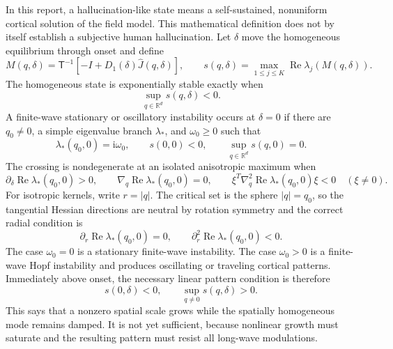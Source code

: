\documentclass[11pt]{article}
\newcommand{\ii}{\mathrm{i}}
\newcommand{\RePart}{\operatorname{Re}}
\newcommand{\T}{\mathsf T}
\begin{document}
In this report, a hallucination-like state means a self-sustained,
nonuniform cortical solution of the field model.  This mathematical
definition does not by itself establish a subjective human hallucination.
Let $\delta$ move the homogeneous equilibrium through onset and define
\begin{equation}
 M(q,\delta)=\T^{-1}\left[-I+D_1(\delta)\widehat J(q,\delta)\right],
 \qquad
 s(q,\delta)=\max_{1\le j\le K}
 \RePart\lambda_j(M(q,\delta)).
 \label{eq:pattern-spectral-abscissa}
\end{equation}
The homogeneous state is exponentially stable exactly when
\begin{equation}
 \sup_{q\in\mathbb R^d}s(q,\delta)<0.
 \label{eq:homogeneous-Rd-gap}
\end{equation}
A finite-wave stationary or oscillatory instability occurs at
$\delta=0$ if there are $q_0\ne0$, a simple eigenvalue branch
$\lambda_*$, and $\omega_0\geq0$ such that
\begin{equation}
 \lambda_*(q_0,0)=\ii\omega_0,
 \qquad
 s(0,0)<0,
 \qquad
 \sup_{q\in\mathbb R^d}s(q,0)=0.
 \label{eq:finite-wave-threshold}
\end{equation}
The crossing is nondegenerate at an isolated anisotropic maximum when
\begin{equation}
 \partial_\delta\RePart\lambda_*(q_0,0)>0,
 \qquad
 \nabla_q\RePart\lambda_*(q_0,0)=0,
 \qquad
 \xi^T\nabla_q^2\RePart\lambda_*(q_0,0)\xi<0
 \quad(\xi\ne0).
 \label{eq:finite-wave-nondegeneracy}
\end{equation}
For isotropic kernels, write $r=|q|$.  The critical set is the sphere
$|q|=q_0$, so the tangential Hessian directions are neutral by rotation
symmetry and the correct radial condition is
\begin{equation}
 \partial_r\RePart\lambda_*(q_0,0)=0,
 \qquad
 \partial_r^2\RePart\lambda_*(q_0,0)<0.
 \label{eq:isotropic-radial-maximum}
\end{equation}
The case $\omega_0=0$ is a stationary finite-wave instability.  The case
$\omega_0>0$ is a finite-wave Hopf instability and produces oscillating or
traveling cortical patterns.  Immediately above onset, the necessary linear
pattern condition is therefore
\begin{equation}
 s(0,\delta)<0,
 \qquad
 \sup_{q\ne0}s(q,\delta)>0.
 \label{eq:linear-hallucination-condition}
\end{equation}
This says that a nonzero spatial scale grows while the spatially homogeneous
mode remains damped.  It is not yet sufficient, because nonlinear growth
must saturate and the resulting pattern must resist all long-wave
modulations.
\end{document}
